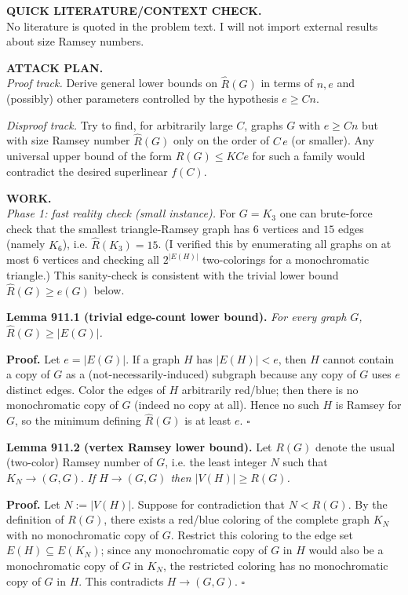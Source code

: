 \medskip
\noindent\textbf{QUICK LITERATURE/CONTEXT CHECK.}\\
No literature is quoted in the problem text. I will not import external results about size Ramsey numbers.

\medskip
\noindent\textbf{ATTACK PLAN.}\\
\emph{Proof track.} Derive general lower bounds on $\hat R(G)$ in terms of $n,e$ and (possibly) other parameters controlled by the hypothesis $e\ge Cn$.

\smallskip
\noindent\emph{Disproof track.} Try to find, for arbitrarily large $C$, graphs $G$ with $e\ge Cn$ but with size Ramsey number $\hat R(G)$ only on the order of $C\,e$ (or smaller). Any universal upper bound of the form $\hat R(G)\le K C e$ for such a family would contradict the desired superlinear $f(C)$.

\medskip
\noindent\textbf{WORK.}\\
\emph{Phase 1: fast reality check (small instance).}  For $G=K_3$ one can brute-force check that the smallest triangle-Ramsey graph has $6$ vertices and $15$ edges (namely $K_6$), i.e. $\hat R(K_3)=15$. (I verified this by enumerating all graphs on at most $6$ vertices and checking all $2^{|E(H)|}$ two-colorings for a monochromatic triangle.) This sanity-check is consistent with the trivial lower bound $\hat R(G)\ge e(G)$ below.

\medskip
\noindent\textbf{Lemma 911.1 (trivial edge-count lower bound).} \emph{For every graph $G$, $\hat R(G)\ge |E(G)|$.}

\noindent\textbf{Proof.} Let $e=|E(G)|$. If a graph $H$ has $|E(H)|<e$, then $H$ cannot contain a copy of $G$ as a (not-necessarily-induced) subgraph because any copy of $G$ uses $e$ distinct edges. Color the edges of $H$ arbitrarily red/blue; then there is no monochromatic copy of $G$ (indeed no copy at all). Hence no such $H$ is Ramsey for $G$, so the minimum defining $\hat R(G)$ is at least $e$. \hfill$\square$

\medskip
\noindent\textbf{Lemma 911.2 (vertex Ramsey lower bound).}  Let $R(G)$ denote the usual (two-color) Ramsey number of $G$, i.e. the least integer $N$ such that $K_N\to (G,G)$. \emph{If $H\to (G,G)$ then $|V(H)|\ge R(G)$.}

\noindent\textbf{Proof.} Let $N:=|V(H)|$. Suppose for contradiction that $N<R(G)$. By the definition of $R(G)$, there exists a red/blue coloring of the complete graph $K_N$ with no monochromatic copy of $G$. Restrict this coloring to the edge set $E(H)\subseteq E(K_N)$; since any monochromatic copy of $G$ in $H$ would also be a monochromatic copy of $G$ in $K_N$, the restricted coloring has no monochromatic copy of $G$ in $H$. This contradicts $H\to (G,G)$. \hfill$\square$

